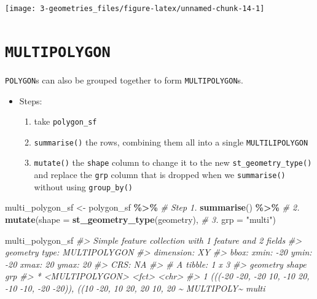 \documentclass[
]{report}
\newenvironment{Shaded}{\begin{snugshade}}{\end{snugshade}}
\newcommand{\CommentTok}[1]{\textcolor[rgb]{0.56,0.35,0.01}{\textit{#1}}}
\newcommand{\DataTypeTok}[1]{\textcolor[rgb]{0.13,0.29,0.53}{#1}}
\newcommand{\KeywordTok}[1]{\textcolor[rgb]{0.13,0.29,0.53}{\textbf{#1}}}
\newcommand{\NormalTok}[1]{#1}
\newcommand{\OperatorTok}[1]{\textcolor[rgb]{0.81,0.36,0.00}{\textbf{#1}}}
\newcommand{\StringTok}[1]{\textcolor[rgb]{0.31,0.60,0.02}{#1}}
\providecommand{\tightlist}{%
  \setlength{\itemsep}{0pt}\setlength{\parskip}{0pt}}
\begin{document}
\begin{center}\texttt{[image: 3-geometries\_files/figure-latex/unnamed-chunk-14-1]} \end{center}

\hypertarget{multipolygon}{%
\section{\texorpdfstring{\texttt{MULTIPOLYGON}}{MULTIPOLYGON}}\label{multipolygon}}

\texttt{POLYGON}s can also be grouped together to form \texttt{MULTIPOLYGON}s.

\begin{itemize}
\tightlist
\item
  Steps:

  \begin{enumerate}
  \def\labelenumi{\arabic{enumi}.}
  \tightlist
  \item
    take \texttt{polygon\_sf}
  \item
    \texttt{summarise()} the rows, combining them all into a single \texttt{MULTILIPOLYGON}
  \item
    \texttt{mutate()} the \texttt{shape} column to change it to the new \texttt{st\_geometry\_type()} and replace the \texttt{grp} column that is dropped when we \texttt{summarise()} without using \texttt{group\_by()}
  \end{enumerate}
\end{itemize}

\begin{Shaded}
\begin{Highlighting}[]
\NormalTok{multi\_polygon\_sf \textless{}{-}}\StringTok{ }\NormalTok{polygon\_sf }\OperatorTok{\%\textgreater{}\%}\StringTok{           }\CommentTok{\# Step 1.}
\StringTok{  }\KeywordTok{summarise}\NormalTok{() }\OperatorTok{\%\textgreater{}\%}\StringTok{                            }\CommentTok{\# 2.}
\StringTok{  }\KeywordTok{mutate}\NormalTok{(}\DataTypeTok{shape =} \KeywordTok{st\_geometry\_type}\NormalTok{(geometry), }\CommentTok{\# 3.}
         \DataTypeTok{grp =} \StringTok{"multi"}\NormalTok{)}

\NormalTok{multi\_polygon\_sf}
\CommentTok{\#\textgreater{} Simple feature collection with 1 feature and 2 fields}
\CommentTok{\#\textgreater{} geometry type:  MULTIPOLYGON}
\CommentTok{\#\textgreater{} dimension:      XY}
\CommentTok{\#\textgreater{} bbox:           xmin: {-}20 ymin: {-}20 xmax: 20 ymax: 20}
\CommentTok{\#\textgreater{} CRS:            NA}
\CommentTok{\#\textgreater{} \# A tibble: 1 x 3}
\CommentTok{\#\textgreater{}                                                                       geometry shape      grp  }
\CommentTok{\#\textgreater{} *                                                               \textless{}MULTIPOLYGON\textgreater{} \textless{}fct\textgreater{}      \textless{}chr\textgreater{}}
\CommentTok{\#\textgreater{} 1 ((({-}20 {-}20, {-}20 10, {-}10 20, {-}10 {-}10, {-}20 {-}20)), ((10 {-}20, 10 20, 20 10, 20 \textasciitilde{} MULTIPOLY\textasciitilde{} multi}
\end{Highlighting}
\end{Shaded}
\end{document}

